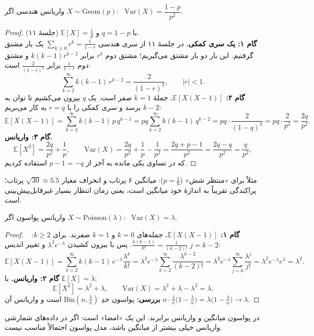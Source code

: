 \begin{proposition}[label=prop:V-geom]{واریانس هندسی}
  اگر $X\sim\mathrm{Geom}(p)$: \ $\mathrm{Var}(X)=\dfrac{1-p}{p^2}$.
\end{proposition}
\begin{proof}
  با $q=1-p$ و $\mathbb E[X]=\frac1p$ (جلسهٔ ۱۱).\\
  \textbf{گام ۱: یک سری کمکی.} در جلسهٔ ۱۱ از سری هندسی $\sum_{k\ge0}r^k=\frac1{1-r}$ یک بار مشتق گرفتیم. این بار دو بار مشتق می‌گیریم؛ مشتق دوم $r^k$ برابر $k(k-1)r^{k-2}$ و مشتق دوم $\frac1{1-r}$ برابر $\frac{2}{(1-r)^3}$ است:
  \[ \sum_{k=2}^{\infty}k(k-1)\,r^{k-2}=\frac{2}{(1-r)^3},\qquad |r|<1. \]
  \textbf{گام ۲: $\mathbb E[X(X-1)]$.} جملهٔ $k=1$ صفر است. یک $q$ بیرون می‌کشیم تا توان به $k-2$ برسد و سری کمکی را با $r=q$ به کار می‌بریم:
  \[ \mathbb E[X(X-1)]=\sum_{k=2}^{\infty}k(k-1)\,p\,q^{k-1}=pq\sum_{k=2}^{\infty}k(k-1)\,q^{k-2}=pq\cdot\frac{2}{(1-q)^3}=pq\cdot\frac{2}{p^3}=\frac{2q}{p^2}. \]
  \textbf{گام ۳: واریانس.}
  \[ \mathbb E[X^2]=\frac{2q}{p^2}+\frac1p,\qquad \mathrm{Var}(X)=\frac{2q}{p^2}+\frac1p-\frac1{p^2}=\frac{2q+p-1}{p^2}=\frac{2q-q}{p^2}=\frac{q}{p^2}, \]
  که در تساوی یکی مانده به آخر از $p-1=-q$ استفاده کردیم.
\end{proof}
مثلاً برای «منتظر شش» ($p=\frac16$): میانگین ۶ پرتاب و انحراف معیار $\sqrt{30}\approx5.5$ پرتاب؛ پراکندگی تقریباً به اندازهٔ خود میانگین است، یعنی زمان انتظار بسیار غیرقابل‌پیش‌بینی است.

\begin{proposition}[label=prop:V-pois]{واریانس پواسون}
  اگر $X\sim\mathrm{Poisson}(\lambda)$: \ $\mathrm{Var}(X)=\lambda$.
\end{proposition}
\begin{proof}
  \textbf{گام ۱: $\mathbb E[X(X-1)]$.} جمله‌های $k=0$ و $k=1$ صفرند. برای $k\ge2$: \ $\frac{k(k-1)}{k!}=\frac{1}{(k-2)!}$. پس با بیرون کشیدن $\lambda^2e^{-\lambda}$ و تغییر اندیس $j=k-2$:
  \[ \mathbb E[X(X-1)]=\sum_{k=2}^{\infty}k(k-1)\,e^{-\lambda}\frac{\lambda^k}{k!}=\lambda^2e^{-\lambda}\sum_{k=2}^{\infty}\frac{\lambda^{k-2}}{(k-2)!}=\lambda^2e^{-\lambda}\sum_{j=0}^{\infty}\frac{\lambda^{j}}{j!}=\lambda^2e^{-\lambda}e^{\lambda}=\lambda^2. \]
  \textbf{گام ۲: واریانس.} با $\mathbb E[X]=\lambda$:
  \[ \mathbb E[X^2]=\lambda^2+\lambda,\qquad \mathrm{Var}(X)=\lambda^2+\lambda-\lambda^2=\lambda. \]
  \textbf{بررسی:} پواسون حدِ $\mathrm{Bin}(n,\frac\lambda n)$ است و واریانس آن $n\cdot\frac\lambda n\bigl(1-\frac\lambda n\bigr)=\lambda\bigl(1-\frac\lambda n\bigr)\to\lambda$.
\end{proof}
در پواسون میانگین و واریانس برابرند. این یک «امضا» است: اگر در داده‌های شمارشی واریانس خیلی بیشتر از میانگین باشد، مدل پواسون احتمالاً مناسب نیست.

